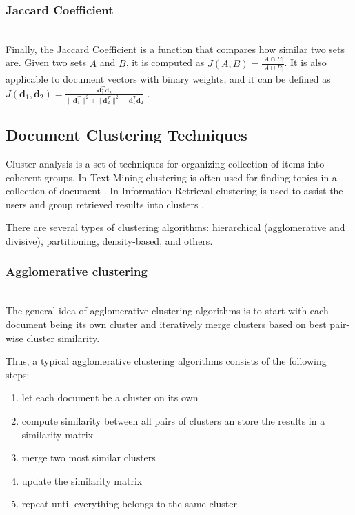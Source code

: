 \subsubsection{Jaccard Coefficient} \ \\

Finally, the Jaccard Coefficient is a function that compares how similar
two sets are. Given two sets $A$ and $B$, it is computed as
$J(A, B) = \frac{|A \cap B|}{|A \cup B|}$.
It is also applicable to document vectors with binary weights, and it can
be defined as $J(\mathbf d_1, \mathbf d_2) =
\frac{\mathbf d_1^T \mathbf d_2}{\| \mathbf d_1^T \|^2 + \| \mathbf d_2^T \|^2 - \mathbf d_1^T \mathbf d_2}$ \cite{manning2008introduction}.



\subsection{Document Clustering Techniques} \label{sec:doc-clustering}

Cluster analysis is a set of techniques for organizing collection
of items into coherent groups. In Text Mining clustering is often
used for finding topics in a collection of document \cite{aggarwal2012survey}.
In Information Retrieval clustering is used to assist the users and group
retrieved results into clusters \cite{cutting1992scatter}.

There are several types of clustering algorithms:
hierarchical (agglomerative and divisive), partitioning,
density-based, and others.


\subsubsection{Agglomerative clustering} \label{sec:clustering-heierarchical} \ \\

The general idea of agglomerative clustering algorithms is to start with
each document being its own cluster and iteratively merge clusters based
on best pair-wise cluster similarity.

Thus, a typical agglomerative clustering algorithms consists of the following steps:

\begin{enumerate}
\itemsep1pt\parskip0pt
  \item let each document be a cluster on its own
  \item compute similarity between all pairs of clusters an store the
      results in a similarity matrix
  \item merge two most similar clusters
  \item update the similarity matrix
  \item repeat until everything belongs to the same cluster
\end{enumerate}

